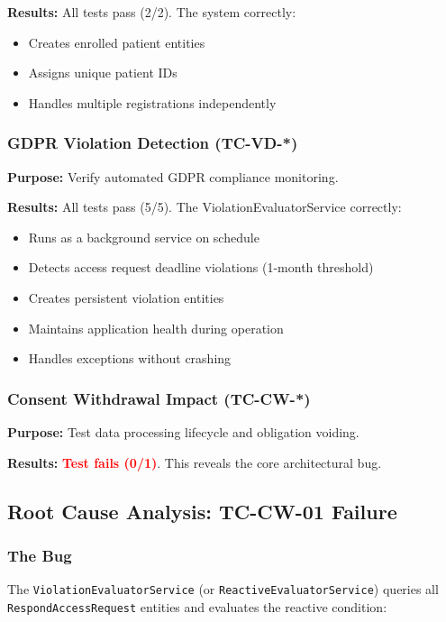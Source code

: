 \documentclass[11pt,a4paper]{article}
\begin{document}
\textbf{Results:} All tests pass (2/2). The system correctly:
\begin{itemize}
    \item Creates enrolled patient entities
    \item Assigns unique patient IDs
    \item Handles multiple registrations independently
\end{itemize}

\subsubsection{GDPR Violation Detection (TC-VD-*)}
\textbf{Purpose:} Verify automated GDPR compliance monitoring.

\textbf{Results:} All tests pass (5/5). The ViolationEvaluatorService correctly:
\begin{itemize}
    \item Runs as a background service on schedule
    \item Detects access request deadline violations (1-month threshold)
    \item Creates persistent violation entities
    \item Maintains application health during operation
    \item Handles exceptions without crashing
\end{itemize}

\subsubsection{Consent Withdrawal Impact (TC-CW-*)}
\textbf{Purpose:} Test data processing lifecycle and obligation voiding.

\textbf{Results:} \textcolor{red}{\textbf{Test fails (0/1)}}. This reveals the core architectural bug.

\subsection{Root Cause Analysis: TC-CW-01 Failure}

\subsubsection{The Bug}
The \texttt{ViolationEvaluatorService} (or \texttt{ReactiveEvaluatorService}) queries all \texttt{RespondAccessRequest} entities and evaluates the reactive condition:
\end{document}
